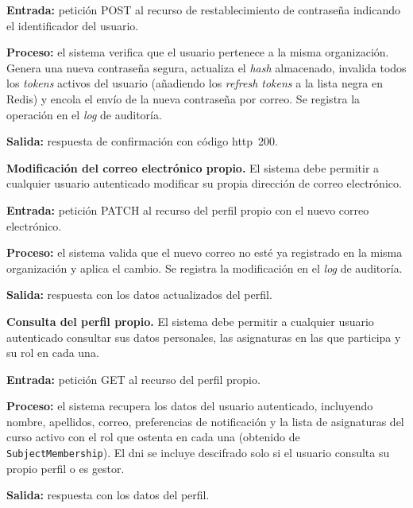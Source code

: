 \begin{functional}
    \textbf{Entrada:} petición POST al recurso de restablecimiento de contraseña indicando
    el identificador del usuario.

    \textbf{Proceso:} el sistema verifica que el usuario pertenece a la misma organización.
    Genera una nueva contraseña segura, actualiza el \textit{hash} almacenado, invalida
    todos los \textit{tokens} activos del usuario (añadiendo los \textit{refresh tokens} a
    la lista negra en Redis) y encola el envío de la nueva contraseña por correo. Se
    registra la operación en el \textit{log} de auditoría.

    \textbf{Salida:} respuesta de confirmación con código \acs{http}~200.

    \item \textbf{Modificación del correo electrónico propio.} \label{rf:users:own_email}
    El sistema debe permitir a cualquier usuario autenticado modificar su propia dirección
    de correo electrónico.

    \textbf{Entrada:} petición PATCH al recurso del perfil propio con el nuevo correo
    electrónico.

    \textbf{Proceso:} el sistema valida que el nuevo correo no esté ya registrado en la
    misma organización y aplica el cambio. Se registra la modificación en el \textit{log}
    de auditoría.

    \textbf{Salida:} respuesta con los datos actualizados del perfil.

    \item \textbf{Consulta del perfil propio.} \label{rf:users:own_profile}
    El sistema debe permitir a cualquier usuario autenticado consultar sus datos personales,
    las asignaturas en las que participa y su rol en cada una.

    \textbf{Entrada:} petición GET al recurso del perfil propio.

    \textbf{Proceso:} el sistema recupera los datos del usuario autenticado, incluyendo
    nombre, apellidos, correo, preferencias de notificación y la lista de asignaturas del
    curso activo con el rol que ostenta en cada una (obtenido de
    \texttt{SubjectMembership}). El \acs{dni} se incluye descifrado solo si el usuario
    consulta su propio perfil o es gestor.

    \textbf{Salida:} respuesta con los datos del perfil.


\end{functional}
